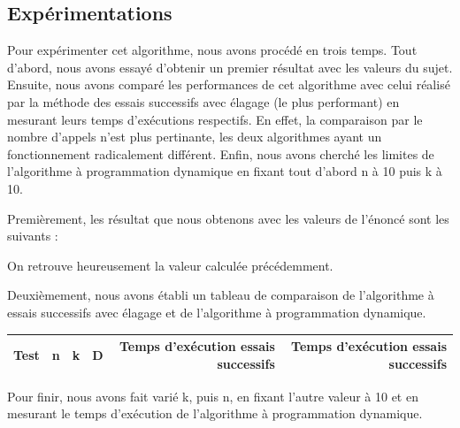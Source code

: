 \documentclass[a4paper, titlepage]{article}
\begin{document}
	\subsection{Expérimentations}
		Pour expérimenter cet algorithme, nous avons procédé en trois temps.
		Tout d'abord, nous avons essayé d'obtenir un premier résultat avec les valeurs du sujet.
		Ensuite, nous avons comparé les performances de cet algorithme avec celui réalisé par la méthode des essais successifs avec élagage (le plus performant) en mesurant leurs temps d'exécutions respectifs.
		En effet, la comparaison par le nombre d'appels n'est plus pertinante, les deux algorithmes ayant un fonctionnement radicalement différent.
		Enfin, nous avons cherché les limites de l'algorithme à programmation dynamique en fixant tout d'abord n à 10 puis k à 10.
		
		Premièrement, les résultat que nous obtenons avec les valeurs de l'énoncé sont les suivants :
		
		On retrouve heureusement la valeur calculée précédemment.
		
		Deuxièmement, nous avons établi un tableau de comparaison de l'algorithme à essais successifs avec élagage et de l'algorithme à programmation dynamique.

		\begin{center}
		\begin{tabular}{|c|c|c|c|r|r|}
			\hline
			Test	& n	& k	& D	& Temps d'exécution essais successifs & Temps d'exécution essais successifs \\
			\hline
		\end{tabular}
		\end{center}
		
		Pour finir, nous avons fait varié k, puis n, en fixant l'autre valeur à 10 et en mesurant le temps d'exécution de l'algorithme à programmation dynamique.
		
\end{document}
